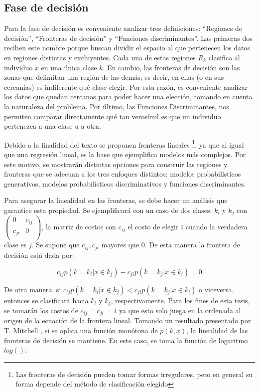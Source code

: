 \subsection{Fase de decisión}
Para la fase de decisión es conveniente analizar tres definiciones: ``Regiones de decisión'',  ``Fronteras de decisión'' y  ``Funciones discriminantes''. Las primeras dos reciben este nombre porque buscan dividir el espacio al que pertenecen los datos en regiones distintas y excluyentes. Cada una de estas regiones $R_{k}$ clasifica al individuo $x$ en una única clase $k$. En cambio, las fronteras de decisión son las zonas que delimitan una región de las demás; es decir, en ellas (o en sus cercanías) es indiferente qué clase elegir. Por esta razón, es conveniente analizar los datos que quedan cercanos para poder hacer una elección, tomando en cuenta la naturaleza del problema. Por último, las Funciones Discriminantes, nos permiten comparar directamente qué tan verosímil es que un individuo pertenezca a una clase u a otra.

Debido a la finalidad del texto se proponen fronteras lineales \footnote{Las fronteras de decisión pueden tomar formas irregulares, pero en general su forma depende del método de clasificación elegido}, ya que al igual que una regresión lineal, es la base que ejemplifica modelos más complejos. Por este motivo, se mostrarán distintas opciones para construir las regiones y fronteras que se adecuan a los tres enfoques distintos: modelos probabilísticos generativos, modelos probabilísticos discriminativos y funciones discriminantes. 

Para asegurar la linealidad en las fronteras, se debe hacer un análisis que garantice esta propiedad. Se ejemplificará con un caso de dos clases: $k_i$ y $k_j$ con $\left( \begin{array}{ccc}
0 & c_{ij} \\
c_{ji} & 0 \\
 \end{array} \right)$, la matriz de costos con $c_{ij}$ el costo de elegir $i$ cuando la verdadera clase es $j$. Se supone que $c_{ij}, c_{ji}$ mayores que 0. De esta manera la frontera de decisión está dada por:

\begin{equation} \label{eq:6}
c_{ij} p( k = k_i | x \in k_j) - c_{ji} p(k = k_j| x \in k_i) = 0
\end{equation}

De otra manera, si $c_{ij} p( k = k_i | x \in k_j) < c_{ji} p( k = k_j| x \in k_i) $ o viceversa, entonces se clasificará hacia $k_i$ y $k_j$, respectivamente. Para los fines de esta tesis, se tomarán los costos de $c_{ij} = c_{ji} = 1$ ya que esto solo juega en la ordenada al origen de la ecuación de la frontera lineal. Tomando un resultado presentado por T. Mitchell \cite{mitchell2006discipline}, si se aplica una función monótona de $p(k, x)$, la linealidad de las fronteras de decisión se mantiene. En este caso, se toma la función de logaritmo $log()$:


